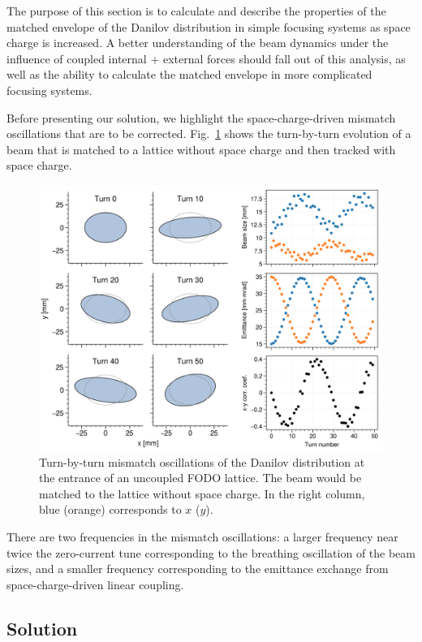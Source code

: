 The purpose of this section is to calculate and describe the properties of the matched envelope of the Danilov distribution in simple focusing systems as space charge is increased. A better understanding of the beam dynamics under the influence of coupled internal + external forces should fall out of this analysis, as well as the ability to calculate the matched envelope in more complicated focusing systems. 

Before presenting our solution, we highlight the space-charge-driven mismatch oscillations that are to be corrected. Fig.~\ref{fig:fodo_mismatch_tbt} shows the turn-by-turn evolution of a beam that is matched to a lattice without space charge and then tracked with space charge. 
%
\begin{figure}[!p]
    \centering
    \includegraphics[width=\textwidth]{Images/chapter2/fodo_mismatch_tbt.png}
    \caption{Turn-by-turn mismatch oscillations of the Danilov distribution at the entrance of an uncoupled FODO lattice. The beam would be matched to the lattice without space charge. In the right column, blue (orange) corresponds to $x$ ($y$).}
    \label{fig:fodo_mismatch_tbt}
\end{figure}
%
There are two frequencies in the mismatch oscillations: a larger frequency near twice the zero-current tune corresponding to the breathing oscillation of the beam sizes, and a smaller frequency corresponding to the emittance exchange from space-charge-driven linear coupling. 


\subsection{Solution}

